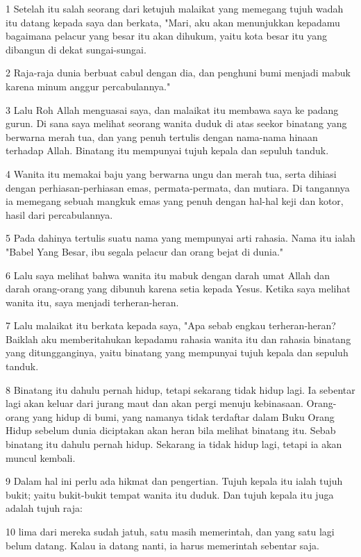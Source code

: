 \par 1 Setelah itu salah seorang dari ketujuh malaikat yang memegang tujuh wadah itu datang kepada saya dan berkata, "Mari, aku akan menunjukkan kepadamu bagaimana pelacur yang besar itu akan dihukum, yaitu kota besar itu yang dibangun di dekat sungai-sungai.
\par 2 Raja-raja dunia berbuat cabul dengan dia, dan penghuni bumi menjadi mabuk karena minum anggur percabulannya."
\par 3 Lalu Roh Allah menguasai saya, dan malaikat itu membawa saya ke padang gurun. Di sana saya melihat seorang wanita duduk di atas seekor binatang yang berwarna merah tua, dan yang penuh tertulis dengan nama-nama hinaan terhadap Allah. Binatang itu mempunyai tujuh kepala dan sepuluh tanduk.
\par 4 Wanita itu memakai baju yang berwarna ungu dan merah tua, serta dihiasi dengan perhiasan-perhiasan emas, permata-permata, dan mutiara. Di tangannya ia memegang sebuah mangkuk emas yang penuh dengan hal-hal keji dan kotor, hasil dari percabulannya.
\par 5 Pada dahinya tertulis suatu nama yang mempunyai arti rahasia. Nama itu ialah "Babel Yang Besar, ibu segala pelacur dan orang bejat di dunia."
\par 6 Lalu saya melihat bahwa wanita itu mabuk dengan darah umat Allah dan darah orang-orang yang dibunuh karena setia kepada Yesus. Ketika saya melihat wanita itu, saya menjadi terheran-heran.
\par 7 Lalu malaikat itu berkata kepada saya, "Apa sebab engkau terheran-heran? Baiklah aku memberitahukan kepadamu rahasia wanita itu dan rahasia binatang yang ditungganginya, yaitu binatang yang mempunyai tujuh kepala dan sepuluh tanduk.
\par 8 Binatang itu dahulu pernah hidup, tetapi sekarang tidak hidup lagi. Ia sebentar lagi akan keluar dari jurang maut dan akan pergi menuju kebinasaan. Orang-orang yang hidup di bumi, yang namanya tidak terdaftar dalam Buku Orang Hidup sebelum dunia diciptakan akan heran bila melihat binatang itu. Sebab binatang itu dahulu pernah hidup. Sekarang ia tidak hidup lagi, tetapi ia akan muncul kembali.
\par 9 Dalam hal ini perlu ada hikmat dan pengertian. Tujuh kepala itu ialah tujuh bukit; yaitu bukit-bukit tempat wanita itu duduk. Dan tujuh kepala itu juga adalah tujuh raja:
\par 10 lima dari mereka sudah jatuh, satu masih memerintah, dan yang satu lagi belum datang. Kalau ia datang nanti, ia harus memerintah sebentar saja.
